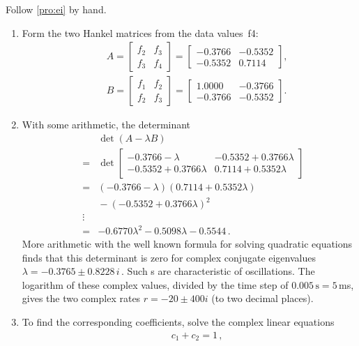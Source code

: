\begin{example}
\begin{solution} 
Follow \autoref{pro:ei} by hand. 
\begin{enumerate}
\item 
Form the two Hankel matrices from the data values~\hlist f4:
\begin{eqnarray*}&&
A=\begin{bmatrix} f_2&f_3\\f_3&f_4 \end{bmatrix}
=\begin{bmatrix} -0.3766 & -0.5352
\\  -0.5352&   0.7114 \end{bmatrix},
\\&&
B=\begin{bmatrix} f_1&f_2\\f_2&f_3 \end{bmatrix}
=\begin{bmatrix} 1.0000&  -0.3766
\\  -0.3766&  -0.5352 \end{bmatrix}.
\end{eqnarray*}
\item 
With some arithmetic, the determinant 
\begin{eqnarray*}
&&\det(A-\lambda B)
\\&=&\det\begin{bmatrix} -0.3766-\lambda & -0.5352+0.3766\lambda
\\  -0.5352+0.3766\lambda&   0.7114+0.5352\lambda \end{bmatrix} 
\\&=&(-0.3766-\lambda)(0.7114+0.5352\lambda)
\\&&{}
-(-0.5352+0.3766\lambda)^2
\\&\vdots& 
\\&=& -0.6770\lambda^2  -0.5098\lambda  -0.5544\,.
\end{eqnarray*}
More arithmetic with the well known formula for solving quadratic equations finds that this determinant is zero for complex conjugate eigenvalues \(\lambda=-0.3765 \pm 0.8228\,i\)\,.
Such s are characteristic of oscillations.
The logarithm of these complex values, divided by the time step of \(0.005\,\text{s}=5\,\)ms, gives the two complex rates \(r=-20\pm400i\) (to two decimal places).
\item 
To find the corresponding coefficients, solve the complex linear equations
\begin{eqnarray*}&&
c_1+c_2=1\,, 
\\&&

\end{eqnarray*}
\end{enumerate}
\end{solution}
\end{example}
